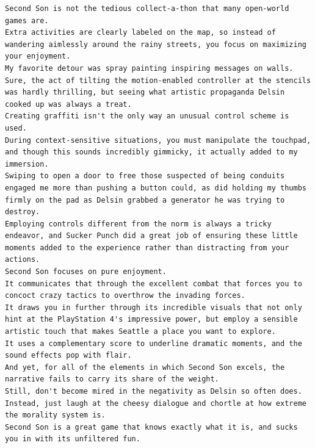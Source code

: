 \documentclass[BTech]{nitgoathesis}
\begin{document}
\begin{lstlisting}[basicstyle=\scriptsize]
Second Son is not the tedious collect-a-thon that many open-world games are.
Extra activities are clearly labeled on the map, so instead of wandering aimlessly around the rainy streets, you focus on maximizing your enjoyment.
My favorite detour was spray painting inspiring messages on walls.
Sure, the act of tilting the motion-enabled controller at the stencils was hardly thrilling, but seeing what artistic propaganda Delsin cooked up was always a treat.
Creating graffiti isn't the only way an unusual control scheme is used.
During context-sensitive situations, you must manipulate the touchpad, and though this sounds incredibly gimmicky, it actually added to my immersion.
Swiping to open a door to free those suspected of being conduits engaged me more than pushing a button could, as did holding my thumbs firmly on the pad as Delsin grabbed a generator he was trying to destroy.
Employing controls different from the norm is always a tricky endeavor, and Sucker Punch did a great job of ensuring these little moments added to the experience rather than distracting from your actions.
Second Son focuses on pure enjoyment.
It communicates that through the excellent combat that forces you to concoct crazy tactics to overthrow the invading forces.
It draws you in further through its incredible visuals that not only hint at the PlayStation 4's impressive power, but employ a sensible artistic touch that makes Seattle a place you want to explore.
It uses a complementary score to underline dramatic moments, and the sound effects pop with flair.
And yet, for all of the elements in which Second Son excels, the narrative fails to carry its share of the weight.
Still, don't become mired in the negativity as Delsin so often does.
Instead, just laugh at the cheesy dialogue and chortle at how extreme the morality system is.
Second Son is a great game that knows exactly what it is, and sucks you in with its unfiltered fun.
\end{lstlisting}
\end{document}
